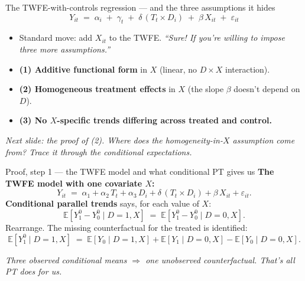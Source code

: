 \documentclass[aspectratio=169,11pt]{beamer}
\begin{document}
\begin{frame}{The TWFE-with-controls regression --- and the three assumptions it hides}
\vspace{0.4em}
\[
Y_{it} \;=\; \alpha_i \;+\; \gamma_t \;+\; \delta\, (T_t \times D_i) \;+\; \beta\, X_{it} \;+\; \varepsilon_{it}
\]
\vspace{0.1em}
\begin{itemize}\small
  \item Standard move: add $X_{it}$ to the TWFE. \;\; \textit{``Sure! If you're willing to impose three more assumptions.''}
  \item \textbf{(1) Additive functional form} in $X$ (linear, no $D \times X$ interaction).
  \item \textbf{(2) Homogeneous treatment effects} in $X$ (the slope $\beta$ doesn't depend on $D$).
  \item \textbf{(3) No $X$-specific trends differing across treated and control.}
\end{itemize}
\vspace{0.4em}
\begin{center}
\small\color{warmgray}\itshape
Next slide: the proof of (2). Where does the homogeneity-in-$X$ assumption come from? Trace it through the conditional expectations.
\end{center}
\end{frame}

\begin{frame}{Proof, step 1 --- the TWFE model and what conditional PT gives us}
\vspace{0.4em}
\textbf{The TWFE model with one covariate $X$:}
\[
Y_{it} \;=\; \alpha_1 + \alpha_2\, T_t + \alpha_3\, D_i + \delta\,(T_t \times D_i) + \beta\, X_{it} + \varepsilon_{it}.
\]
\vspace{0.3em}
\textbf{Conditional parallel trends} says, for each value of $X$:
\[
\mathbb{E}[Y^0_1 - Y^0_0 \mid D{=}1, X] \;=\; \mathbb{E}[Y^0_1 - Y^0_0 \mid D{=}0, X].
\]
\vspace{0.1em}
Rearrange. The missing counterfactual for the treated is identified:
\[
\mathbb{E}[Y^0_1 \mid D{=}1, X] \;=\; \mathbb{E}[Y_0 \mid D{=}1, X] + \mathbb{E}[Y_1 \mid D{=}0, X] - \mathbb{E}[Y_0 \mid D{=}0, X].
\]
\vspace{0.2em}
\begin{center}
\footnotesize\color{warmgray}\itshape
Three observed conditional means $\Rightarrow$ one unobserved counterfactual. \;That's all PT does for us.
\end{center}
\end{frame}
\end{document}
